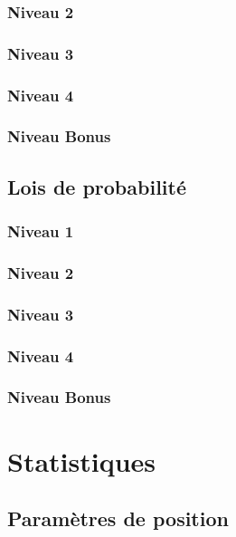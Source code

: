 \documentclass[a4paper]{report}
\begin{document}
			\subsection{Niveau 2}
		
			\subsection{Niveau 3}
			
			\subsection{Niveau 4}
			
			\subsection{Niveau Bonus}
		
		\section{Lois de probabilité}
		
			\subsection{Niveau 1}
		
			\subsection{Niveau 2}
		
			\subsection{Niveau 3}
			
			\subsection{Niveau 4}
			
			\subsection{Niveau Bonus}
	
	\chapter{Statistiques}
	
		\section{Paramètres de position}
		
\end{document}

